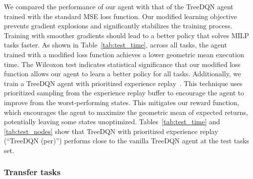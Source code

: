 \documentclass[preprint,12pt]{elsarticle} %
\theoremstyle{plain}
\theoremstyle{definition}
\theoremstyle{remark}
\begin{document}
We compared the performance of our agent with that of the TreeDQN agent trained with the standard MSE loss function. Our modified learning objective prevents gradient explosions and significantly stabilizes the training process. Training with smoother gradients should lead to a better policy that solves MILP tasks faster. As shown in Table~\ref{tab:test_time}, across all tasks, the agent trained with a modified loss function achieves a lower geometric mean execution time. The Wilcoxon test \cite{Wilcoxon1945} indicates statistical significance that our modified loss function allows our agent to learn a better policy for all tasks. %
Additionally, we train a TreeDQN agent with prioritized experience replay~\cite{PER}. This technique uses prioritized sampling from the experience replay buffer to encourage the agent to improve from the worst-performing states. This mitigates our reward function, which encourages the agent to maximize the geometric mean of expected returns, potentially leaving some states unoptimized. Tables~\ref{tab:test_time} and \ref{tab:test_nodes} show that TreeDQN with prioritized experience replay (``TreeDQN (per)'') performs close to the vanilla TreeDQN agent at the test tasks set.  


\subsubsection{Transfer tasks}\label{sec:transfer}
\end{document}
